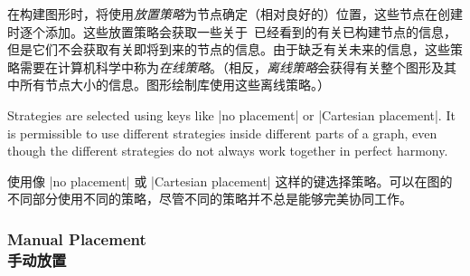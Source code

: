 在构建图形时，将使用\emph{放置策略}为节点确定（相对良好的）位置，这些节点在创建时逐个添加。这些放置策略会获取一些关于\tikzname\ 已经看到的有关已构建节点的信息，但是它们不会获取有关即将到来的节点的信息。由于缺乏有关未来的信息，这些策略需要在计算机科学中称为\emph{在线策略}。（相反，\emph{离线策略}会获得有关整个图形及其中所有节点大小的信息。图形绘制库使用这些离线策略。）

Strategies are selected using keys like |no placement| or
|Cartesian placement|. It is permissible to use different strategies inside
different parts of a graph, even though the different strategies do not always
work together in perfect harmony.

使用像 |no placement| 或 |Cartesian placement| 这样的键选择策略。可以在图的不同部分使用不同的策略，尽管不同的策略并不总是能够完美协同工作。


\subsubsection{Manual Placement\\手动放置}
\label{section-graphs-xy}


